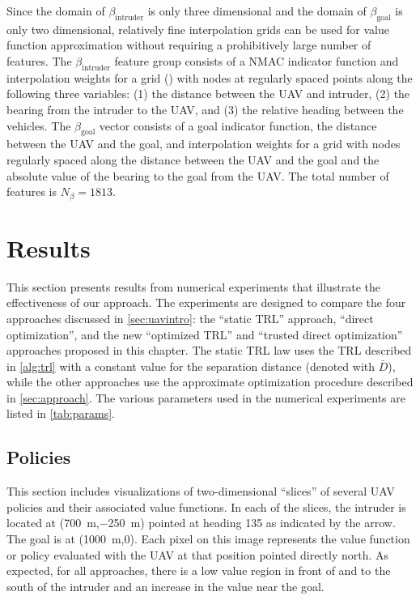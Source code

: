 Since the domain of $\beta_\text{intruder}$ is only three dimensional and the domain of $\beta_\text{goal}$ is only two dimensional, relatively fine interpolation grids can be used for value function approximation without requiring a prohibitively large number of features. The $\beta_\text{intruder}$ feature group consists of a NMAC indicator function and interpolation weights for a grid () with nodes at regularly spaced points along the following three variables: (1) the distance between the UAV and intruder, (2) the bearing from the intruder to the UAV, and (3) the relative heading between the vehicles. The $\beta_\text{goal}$ vector consists of a goal indicator function, the distance between the UAV and the goal, and interpolation weights for a grid
with nodes regularly spaced along the distance between the UAV and the goal and the absolute value of the bearing to the goal from the UAV. The total number of features is $N_\beta = 1813$.


\section{Results} \label{sec:results}

This section presents results from numerical experiments that illustrate the effectiveness of our approach. The experiments are designed to compare the four approaches discussed in \cref{sec:uavintro}: the ``static TRL'' approach, ``direct optimization'', and the new ``optimized TRL'' and ``trusted direct optimization'' approaches proposed in this chapter. The static TRL law uses the TRL described in \cref{alg:trl} with a constant value for the separation distance (denoted with $\bar{D}$), while the other approaches use the approximate optimization procedure described in \cref{sec:approach}. The various parameters used in the numerical experiments are listed in \cref{tab:params}.

\subsection{Policies}

This section includes visualizations of two-dimensional ``slices'' of several UAV policies and their associated value functions. In each of the slices, the intruder is located at (\SI{700}{m},\SI{-250}{m}) pointed at heading 135 as indicated by the arrow. The goal is at (\SI{1000}{m},\num{0}). Each pixel on this image represents the value function or policy evaluated with the UAV at that position pointed directly north. As expected, for all approaches, there is a low value region in front of and to the south of the intruder and an increase in the value near the goal.

